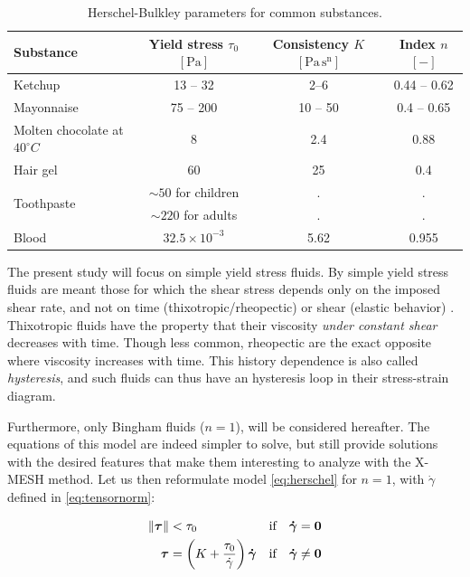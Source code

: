 \documentclass[11 pt]{report}
\begin{document}
\begin{table}[t]
    \centering
    \begin{tabular}[t]{lccc}
        \toprule
        Substance 
        & Yield stress $\tau_0$ $[\mathrm{Pa}]$ 
        & Consistency $K$ $[\mathrm{Pa \, s^n}]$ 
        & Index $n$ $[-]$\\
        \midrule
        Ketchup \cite{ketchup}       & 13 -- 32 & 2--6 & 0.44 -- 0.62 \\[2pt]
        Mayonnaise \cite{mayonnaise1,mayonnaise2} & 75 -- 200 & 10 -- 50 & 0.4 -- 0.65 \\[2pt]
        Molten chocolate at $40^\circ C$ \cite{chocolate} & 8 & 2.4 & 0.88 \\[2pt]
        Hair gel \cite{gel}                     & 60 & 25 & 0.4 \\[2pt]
        \multirow{2}{*}{Toothpaste\cite{toothpaste}}
                                     & $\sim 50$ for children & . & . \\
                                     & $\sim 220$ for adults & . & . \\[2pt]
        Blood \cite{Lee2011}         & $32.5\times 10^{-3}$ & 5.62 & 0.955 \\[2pt]
        \bottomrule
    \end{tabular}
    \caption{Herschel-Bulkley parameters for common substances.}
    \label{tab:parameters}
\end{table}%

The present study will focus on simple yield stress fluids. By simple yield stress fluids are meant those for which the shear stress depends only on the imposed shear rate, and not on time (thixotropic/rheopectic) or shear (elastic behavior) \cite{simpleyield}. Thixotropic fluids have the property that their viscosity \textit{under constant shear} decreases with time. Though less common, rheopectic are the exact opposite where viscosity increases with time. This history dependence is also called \textit{hysteresis}, and such fluids can thus have an hysteresis loop in their stress-strain diagram. 

Furthermore, only Bingham fluids ($n=1$), will be considered hereafter. The equations of this model are indeed simpler to solve, but still provide solutions with the desired features that make them interesting to analyze with the X-MESH method. Let us then reformulate model \eqref{eq:herschel} for $n=1$, with $\dot\gamma$ defined in \eqref{eq:tensornorm}:
\begin{empheqboxed}
    \begin{equation}
        \begin{aligned}
            \|\boldsymbol\tau\| &< \tau_0 & \text{if} \quad \gam = \mathbf{0} \\ %
            \boldsymbol{\tau} &= \left(K + \frac{\tau_0}{\dot \gamma}\right) \gam & \text{if} \quad  \gam \neq \mathbf{0} %
        \end{aligned}
        \label{eq:constitutive}
    \end{equation}
\end{empheqboxed}
\end{document}
